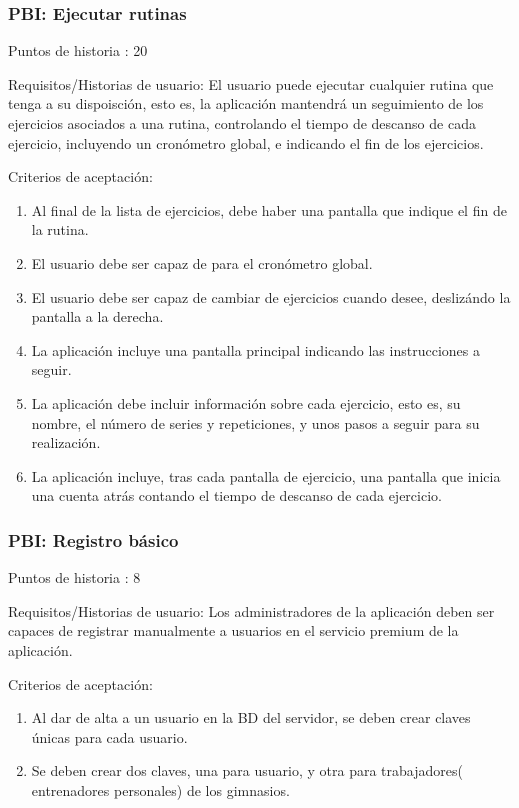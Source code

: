 \documentclass[11pt,a4paper]{report}
\begin{document}
\subsubsection{PBI: Ejecutar rutinas}

Puntos de historia : 20

Requisitos/Historias de usuario: El usuario puede ejecutar cualquier rutina que tenga a su dispoisción, esto es, la aplicación mantendrá un seguimiento de los ejercicios asociados a una rutina, controlando el tiempo de descanso de cada ejercicio, incluyendo un cronómetro global, e indicando el fin de los ejercicios.

Criterios de aceptación:
\begin{enumerate}
	\item Al final de la lista de ejercicios, debe haber una pantalla que indique el fin de la rutina.

	\item El usuario debe ser capaz de para el cronómetro global.

	\item El usuario debe ser capaz de cambiar de ejercicios cuando desee, deslizándo la pantalla a la derecha.

	\item La aplicación incluye una pantalla principal indicando las instrucciones a seguir.

	\item La aplicación debe incluir información sobre cada ejercicio, esto es, su nombre, el número de series y repeticiones, y unos pasos a seguir para su realización.

	\item La aplicación incluye, tras cada pantalla de ejercicio, una pantalla que inicia una cuenta atrás contando el tiempo de descanso de cada ejercicio.

\end{enumerate}
\subsubsection{PBI: Registro básico}
Puntos de historia : 8

Requisitos/Historias de usuario: Los administradores de la aplicación deben ser capaces de registrar manualmente a usuarios en el servicio premium de la aplicación.

Criterios de aceptación:
\begin{enumerate}
	\item Al dar de alta a un usuario en la BD del servidor, se deben crear claves únicas para cada usuario.

	\item Se deben crear dos claves, una para usuario, y otra para trabajadores( entrenadores personales) de los gimnasios.

\end{enumerate}
\end{document}

